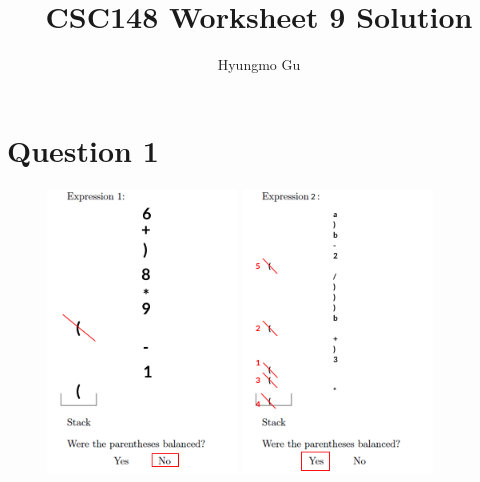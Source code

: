 \documentclass[12pt]{article}
\begin{document}
\title{CSC148 Worksheet 9 Solution}
\author{Hyungmo Gu}
\maketitle

\section*{Question 1}
\begin{figure}[h!]
    \includegraphics[width=0.45\textwidth]{images/worksheet_9_q1a_solution.png}\hfill
    \includegraphics[width=0.45\textwidth]{images/worksheet_9_q1b_solution.png}\hfill
\end{figure}
\end{document}
